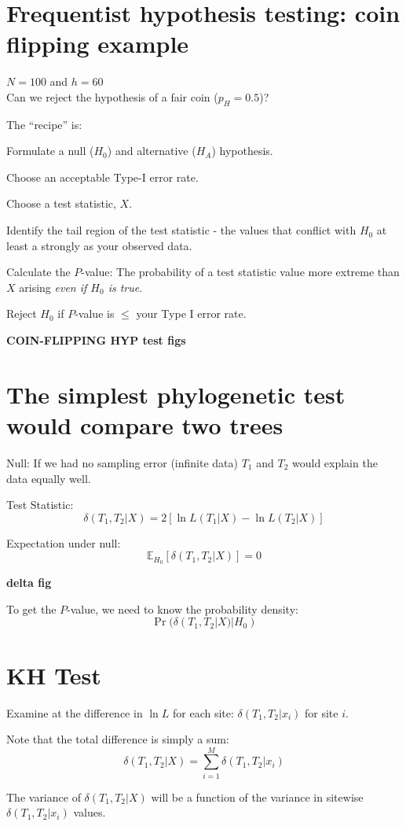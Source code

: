 \documentclass[landscape]{foils}
\begin{document}
\myNewSlide
\section*{Frequentist hypothesis testing: coin flipping example}
$N=100$ and $h=60$\\
Can we reject the hypothesis of a fair coin ($p_H = 0.5$)?

The ``recipe'' is:
\begin{compactenum}
	\item Formulate a null ($H_0$) and alternative ($H_A$) hypothesis.
	\item Choose an acceptable Type-I error rate.
	\item Choose a test statistic, $X.$
	\item Identify the tail region of the test statistic - the values that conflict with $H_0$ at least a strongly as your observed data.
	\item Calculate the $P$-value: The probability of a test statistic value more extreme than $X$ arising {\em even if $H_0$  is true}.
	\item Reject $H_0$ if $P$-value is $\leq$ your Type I error rate.
\end{compactenum}

\myNewSlide
{\bf COIN-FLIPPING HYP test figs}

\myNewSlide
\section*{The simplest phylogenetic test would compare two trees}
\Large
Null: If we had no sampling error (infinite data) $T_1$ and $T_2$ would explain the data equally well. 

Test Statistic: $$\delta(T_1,T_2|X) = 2\left[\ln L(T_1|X) - \ln L(T_2|X)\right]$$

Expectation under null: $$\mathbb{E}_{H_0}\left[\delta(T_1,T_2|X)\right] = 0$$

\myNewSlide
{\bf delta fig}

To get the $P$-value, we need to know the probability density: $$\Pr(\delta(T_1,T_2|X)|H_0)$$

\myNewSlide
\section*{KH Test}
\begin{compactenum}
	\item Examine at the difference in $\ln L$ for each site: $\delta(T_1,T_2|x_i)$ for site $i$.
	\item Note that the total difference is simply a sum:
		$$\delta(T_1,T_2|X) = \sum_{i=1}^M\delta(T_1,T_2|x_i)$$
	\item The variance of $\delta(T_1,T_2|X)$ will be a function of the variance in sitewise $\delta(T_1,T_2|x_i)$ values.
\end{compactenum}
\end{document}

